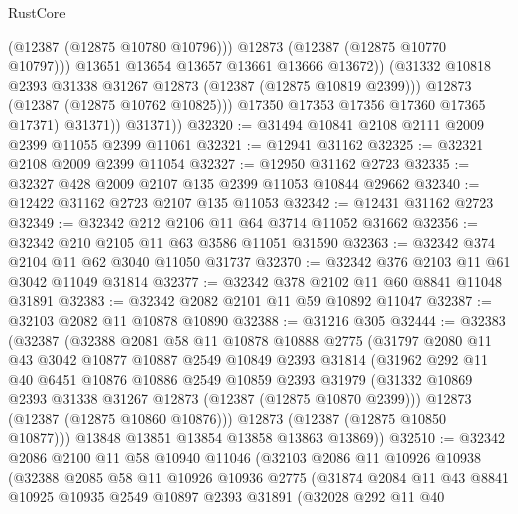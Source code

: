 \begin{lexlean}{RustCore}
\begin{coremodule}
                        (@12387 (@12875 @10780 @10796)))
                      @12873
                      (@12387 (@12875 @10770 @10797)))
                    @13651
                    @13654
                    @13657
                    @13661
                    @13666
                    @13672))
                (@31332 @10818 @2393 @31338 @31267 @12873 (@12387 (@12875 @10819 @2399)))
                @12873
                (@12387 (@12875 @10762 @10825)))
              @17350
              @17353
              @17356
              @17360
              @17365
              @17371)
            @31371))
        @31371))
@32320 := @31494 @10841 @2108 @2111 @2009 @2399 @11055 @2399 @11061
@32321 := @12941 @31162
@32325 := @32321 @2108 @2009 @2399 @11054
@32327 := @12950 @31162 @2723
@32335 := @32327 @428 @2009 @2107 @135 @2399 @11053 @10844 @29662
@32340 := @12422 @31162 @2723 @2107 @135 @11053
@32342 := @12431 @31162 @2723
@32349 := @32342 @212 @2106 @11 @64 @3714 @11052 @31662
@32356 := @32342 @210 @2105 @11 @63 @3586 @11051 @31590
@32363 := @32342 @374 @2104 @11 @62 @3040 @11050 @31737
@32370 := @32342 @376 @2103 @11 @61 @3042 @11049 @31814
@32377 := @32342 @378 @2102 @11 @60 @8841 @11048 @31891
@32383 := @32342 @2082 @2101 @11 @59 @10892 @11047
@32387 := @32103 @2082 @11 @10878 @10890
@32388 := @31216 @305
@32444 := @32383
    (@32387
      (@32388
        @2081
        @58
        @11
        @10878
        @10888
        @2775
        (@31797
          @2080
          @11
          @43
          @3042
          @10877
          @10887
          @2549
          @10849
          @2393
          @31814
          (@31962
            @292
            @11
            @40
            @6451
            @10876
            @10886
            @2549
            @10859
            @2393
            @31979
            (@31332 @10869 @2393 @31338 @31267 @12873 (@12387 (@12875 @10870 @2399)))
            @12873
            (@12387 (@12875 @10860 @10876)))
          @12873
          (@12387 (@12875 @10850 @10877)))
        @13848
        @13851
        @13854
        @13858
        @13863
        @13869))
@32510 := @32342
    @2086
    @2100
    @11
    @58
    @10940
    @11046
    (@32103
      @2086
      @11
      @10926
      @10938
      (@32388
        @2085
        @58
        @11
        @10926
        @10936
        @2775
        (@31874
          @2084
          @11
          @43
          @8841
          @10925
          @10935
          @2549
          @10897
          @2393
          @31891
          (@32028
            @292
            @11
            @40

\end{coremodule}
\end{lexlean}

